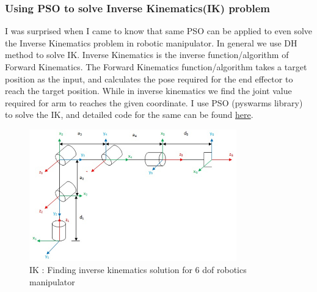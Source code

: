 \subsubsection{Using PSO to solve Inverse Kinematics(IK) problem}
I was surprised when I came to know that same PSO can be applied to even solve the Inverse Kinematics problem in robotic manipulator. In general we use DH method to solve IK.\cite{dh}
Inverse Kinematics is the inverse function/algorithm of Forward Kinematics. The Forward Kinematics function/algorithm takes a target position as the input, and calculates the pose required for the end effector to reach the target position. While in inverse kinematics we find the joint value required for arm to reaches the given coordinate.
I use PSO (pyswarms library) to solve the IK, and detailed code for the same can be found \href{https://github.com/iamrajee/Slam_and_RL_BTP/tree/master/code/swarm/pso}{here}.
\newline \begin{figure}[H]
    \centering
    \includegraphics[width=0.8\textwidth]{images/6dof.jpg}
    \caption{IK : Finding inverse kinematics solution for 6 dof robotics manipulator}
\end{figure}

